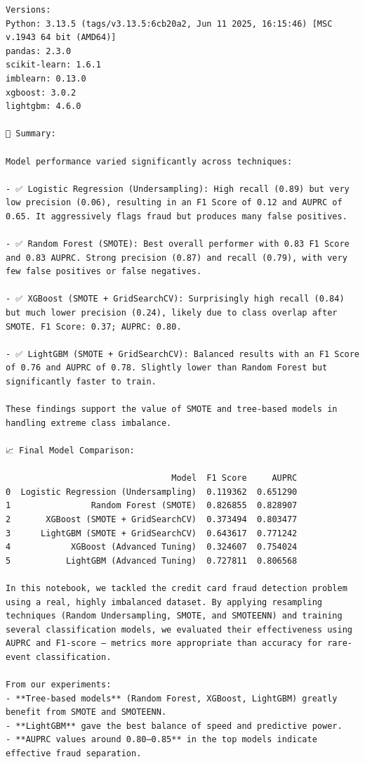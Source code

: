 \documentclass[
  letterpaper,
  DIV=11,
  numbers=noendperiod]{scrartcl}
\begin{document}
\begin{verbatim}
Versions:
Python: 3.13.5 (tags/v3.13.5:6cb20a2, Jun 11 2025, 16:15:46) [MSC v.1943 64 bit (AMD64)]
pandas: 2.3.0
scikit-learn: 1.6.1
imblearn: 0.13.0
xgboost: 3.0.2
lightgbm: 4.6.0

📌 Summary:

Model performance varied significantly across techniques:

- ✅ Logistic Regression (Undersampling): High recall (0.89) but very low precision (0.06), resulting in an F1 Score of 0.12 and AUPRC of 0.65. It aggressively flags fraud but produces many false positives.

- ✅ Random Forest (SMOTE): Best overall performer with 0.83 F1 Score and 0.83 AUPRC. Strong precision (0.87) and recall (0.79), with very few false positives or false negatives.

- ✅ XGBoost (SMOTE + GridSearchCV): Surprisingly high recall (0.84) but much lower precision (0.24), likely due to class overlap after SMOTE. F1 Score: 0.37; AUPRC: 0.80.

- ✅ LightGBM (SMOTE + GridSearchCV): Balanced results with an F1 Score of 0.76 and AUPRC of 0.78. Slightly lower than Random Forest but significantly faster to train.

These findings support the value of SMOTE and tree-based models in handling extreme class imbalance.

📈 Final Model Comparison:

                                 Model  F1 Score     AUPRC
0  Logistic Regression (Undersampling)  0.119362  0.651290
1                Random Forest (SMOTE)  0.826855  0.828907
2       XGBoost (SMOTE + GridSearchCV)  0.373494  0.803477
3      LightGBM (SMOTE + GridSearchCV)  0.643617  0.771242
4            XGBoost (Advanced Tuning)  0.324607  0.754024
5           LightGBM (Advanced Tuning)  0.727811  0.806568

In this notebook, we tackled the credit card fraud detection problem using a real, highly imbalanced dataset. By applying resampling techniques (Random Undersampling, SMOTE, and SMOTEENN) and training several classification models, we evaluated their effectiveness using AUPRC and F1-score — metrics more appropriate than accuracy for rare-event classification.

From our experiments:
- **Tree-based models** (Random Forest, XGBoost, LightGBM) greatly benefit from SMOTE and SMOTEENN.
- **LightGBM** gave the best balance of speed and predictive power.
- **AUPRC values around 0.80–0.85** in the top models indicate effective fraud separation.


\end{verbatim}
\end{document}
